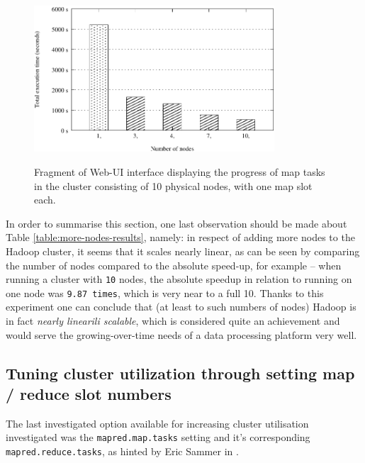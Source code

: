 \begin{figure}[ch!]
  \centering
  \includegraphics[width=0.80\textwidth]{img/hadoop/nodes-perf.pdf}
  \label{fig:nodes-pers-graph}
  \caption{Fragment of Web-UI interface displaying the progress of map tasks in the cluster consisting of 10 physical nodes, with one map slot each.}
\end{figure}

In order to summarise this section, one last observation should be made about Table \ref{table:more-nodes-results}, namely: in respect of adding more nodes to the Hadoop cluster, it seems that it scales nearly linear, as can be seen by comparing the number of nodes compared to the absolute speed-up, for example -- when running a cluster with \verb|10| nodes, the absolute speedup in relation to running on one node was \verb|9.87 times|, which is very near to a full 10. Thanks to this experiment one can conclude that (at least to such numbers of nodes) Hadoop is in fact \textit{nearly linearili scalable}, which is considered quite an achievement and would serve the growing-over-time needs of a data processing platform very well.


\subsection{Tuning cluster utilization through setting map / reduce slot numbers}
The last investigated option available for increasing cluster utilisation investigated was the \verb|mapred.map.tasks| setting and it's corresponding \verb|mapred.reduce.tasks|, as hinted by Eric Sammer in \cite{hadoop-ops}.

